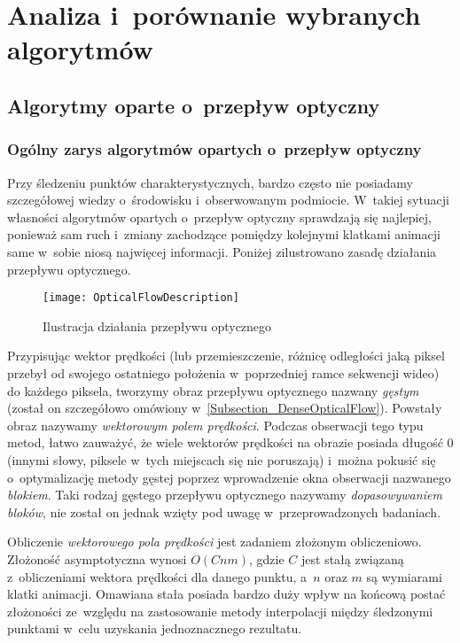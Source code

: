 \chapter{Analiza i~porównanie wybranych algorytmów}\label{Section_Algorytmy}

  \section{Algorytmy oparte o~przepływ optyczny}\label{Subsection_OpticalFlow}

    \subsection{Ogólny zarys algorytmów opartych o~przepływ optyczny}
    Przy śledzeniu punktów charakterystycznych, bardzo często nie posiadamy szczegółowej wiedzy o~środowisku i~obserwowanym podmiocie. W~takiej sytuacji własności algorytmów opartych o~przepływ optyczny sprawdzają się najlepiej, ponieważ sam ruch i~zmiany zachodzące pomiędzy kolejnymi klatkami animacji same w~sobie niosą najwięcej informacji\cite{OpticalFlowNonPriori05}. Poniżej zilustrowano zasadę działania przepływu optycznego.

    \begin{figure}[!ht]
      \centering
      \texttt{[image: OpticalFlowDescription]}
      \caption[Ilustracja działania przepływu optycznego]{Ilustracja działania przepływu optycznego}
      \label{fig:OpticalFlowDescription}
    \end{figure}

    Przypisując wektor prędkości (lub przemieszczenie, różnicę odległości jaką piksel przebył od swojego ostatniego położenia w~poprzedniej ramce sekwencji wideo) do każdego piksela, tworzymy obraz przepływu optycznego nazwany \textit{gęstym} (został on szczegółowo omówiony w~\ref{Subsection_DenseOpticalFlow}). Powstały obraz nazywamy \textit{wektorowym polem prędkości}. Podczas obserwacji tego typu metod, łatwo zauważyć, że wiele wektorów prędkości na obrazie posiada długość $0$ (innymi słowy, piksele w~tych miejscach się nie poruszają) i~można pokusić się o~optymalizację metody gęstej poprzez wprowadzenie okna obserwacji nazwanego \textit{blokiem}. Taki rodzaj gęstego przepływu optycznego nazywamy \textit{dopasowywaniem bloków}, nie został on jednak wzięty pod uwagę w~przeprowadzonych badaniach.

    Obliczenie \textit{wektorowego pola prędkości} jest zadaniem złożonym obliczeniowo. Złożoność asymptotyczna wynosi $O(Cnm)$, gdzie $C$ jest stałą związaną z~obliczeniami wektora prędkości dla danego punktu, a~$n$ oraz $m$ są wymiarami klatki animacji. Omawiana stała posiada bardzo duży wpływ na końcową postać złożoności ze~względu na zastosowanie metody interpolacji między śledzonymi punktami w~celu uzyskania jednoznacznego rezultatu.

